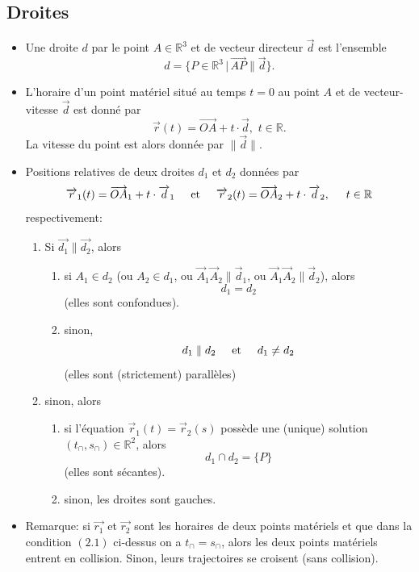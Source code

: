 \documentclass[12pt,a4paper]{article}
\newcommand{\vect}{\overrightarrow}
\begin{document}
\newpage
\subsection{Droites}
\begin{itemize}[label=$\bullet$]
\item Une \colorbox{def!40}{droite} $d$ par le point $A\in\mathbb{R}^3$ et de vecteur directeur $\vect{d}$ est l'ensemble \[d=\{P\in\mathbb{R}^3\,|\,\vect{AP}\parallel \vect{d}\}.\]
\item L'\colorbox{def!40}{horaire} d'un point matériel situé au temps $t=0$ au point $A$ et de vecteur-vitesse $\vect{d}$ est donné par 
\[\vect{r}(t)=\vect{OA}+t\cdot \vect{d},\,\,t\in\mathbb{R}.\]
La \colorbox{def!40}{vitesse} du point est alors donnée par $\|\vect{d}\|$.
\item Positions relatives de deux droites $d_1$ et $d_2$ données par $$\vect{r}_1(t)=\vect{OA}_1+t\cdot \vect{d}_1  \hspace{0.5cm}\text{et}\hspace{0.5cm}  \vect{r}_2(t)=\vect{OA}_2+t\cdot \vect{d}_2, \hspace{0.5cm} t\in\mathbb{R} $$ respectivement:
\begin{enumerate}
\item[(1)] Si $\vect{d_1}\parallel\vect{d_2}$, alors
\begin{enumerate}
\item[(1.1)] si $A_1\in d_2$ (ou $A_2\in d_1$, ou $\vect{A}_1\vect{A}_2\parallel \vect{d}_1$, ou $\vect{A}_1\vect{A}_2\parallel \vect{d}_2$), alors $$d_1=d_2$$ (elles sont \colorbox{def!40}{confondues}).
\item[(1.2)] sinon, $$d_1\parallel d_2 \hspace{0.5cm}\text{et}\hspace{0.5cm} d_1\ne d_2$$ (elles sont \colorbox{def!40}{(strictement) parallèles})
\end{enumerate}
\item[(2)] sinon, alors
\begin{enumerate}
\item[(2.1)] si l'équation $\vect{r}_1(t)=\vect{r}_2(s)$ possède une (unique) solution $(t_\cap,s_\cap)\in\mathbb{R}^2$, alors $$d_1\cap d_2=\{P\}$$ (elles sont \colorbox{def!40}{sécantes}).
\item[(2.2)] sinon, les droites sont \colorbox{def!40}{gauches}.
\end{enumerate}
\end{enumerate}
\item \textcolor{expl!60!black}{Remarque:} si $\vect{r_1}$ et $\vect{r_2}$ sont les horaires de deux points matériels et que dans la condition $(2.1)$ ci-dessus on a $t_\cap=s_\cap$, alors les deux points matériels entrent en \colorbox{def!40}{collision}. Sinon, leurs trajectoires se croisent (sans collision).
\end{itemize}
\end{document}
